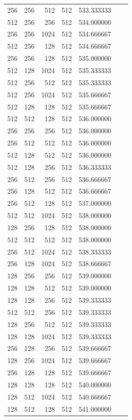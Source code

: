 \documentclass{article}
\begin{document}
{\begin{longtable}{rrrrrrr}
256 & 256 & 512 & 512 & 533.333333 \\
512 & 256 & 256 & 512 & 534.000000 \\
256 & 256 & 1024 & 512 & 534.666667 \\
512 & 256 & 128 & 512 & 534.666667 \\
256 & 256 & 128 & 512 & 535.000000 \\
512 & 128 & 1024 & 512 & 535.333333 \\
512 & 256 & 512 & 512 & 535.333333 \\
512 & 256 & 1024 & 512 & 535.666667 \\
512 & 128 & 128 & 512 & 535.666667 \\
512 & 512 & 128 & 512 & 536.000000 \\
256 & 256 & 256 & 512 & 536.000000 \\
256 & 512 & 512 & 512 & 536.000000 \\
512 & 128 & 512 & 512 & 536.000000 \\
512 & 128 & 256 & 512 & 536.333333 \\
256 & 512 & 256 & 512 & 536.666667 \\
256 & 128 & 512 & 512 & 536.666667 \\
256 & 512 & 128 & 512 & 537.000000 \\
512 & 512 & 1024 & 512 & 538.000000 \\
128 & 256 & 128 & 512 & 538.000000 \\
512 & 512 & 512 & 512 & 538.000000 \\
256 & 512 & 1024 & 512 & 538.333333 \\
256 & 128 & 1024 & 512 & 538.666667 \\
128 & 256 & 256 & 512 & 539.000000 \\
128 & 128 & 512 & 512 & 539.000000 \\
128 & 128 & 256 & 512 & 539.333333 \\
512 & 512 & 256 & 512 & 539.333333 \\
128 & 256 & 512 & 512 & 539.333333 \\
128 & 128 & 1024 & 512 & 539.333333 \\
256 & 128 & 256 & 512 & 539.666667 \\
128 & 256 & 1024 & 512 & 539.666667 \\
256 & 128 & 128 & 512 & 539.666667 \\
128 & 128 & 128 & 512 & 540.000000 \\
128 & 512 & 1024 & 512 & 540.666667 \\
128 & 512 & 128 & 512 & 541.000000 \\

\end{longtable}}
\end{document}

